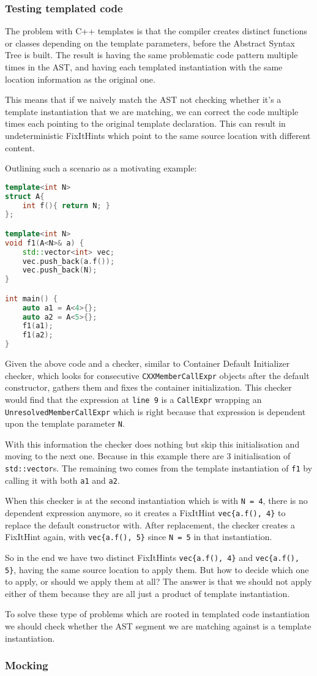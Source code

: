 \subsubsection{Testing templated code}
\par The problem with C++ templates is that the compiler creates distinct functions or classes depending on the template parameters, before the Abstract Syntax Tree is built. The result is having the same problematic code pattern multiple times in the AST, and having each templated instantiation with the same location information as the original one. \medskip
\par This means that if we naively match the AST not checking whether it's a template instantiation that we are matching, we can correct the code multiple times each pointing to the original template declaration. This can result in undeterministic FixItHints which point to the same source location with different content.  \pagebreak
\par Outlining such a scenario as a motivating example: 
\begin{lstlisting}[language=c++, frame=single]
template<int N>
struct A{
	int f(){ return N; }
};

template<int N>
void f1(A<N>& a) {
	std::vector<int> vec;
	vec.push_back(a.f());
	vec.push_back(N);
}

int main() {
	auto a1 = A<4>{};
	auto a2 = A<5>{};
	f1(a1);
	f1(a2);
}
\end{lstlisting}
Given the above code and a checker, similar to Container Default Initializer checker, which looks for consecutive \verb|CXXMemberCallExpr| objects after the default constructor, gathers them and fixes the container initialization. This checker would find that the expression at \verb|line 9| is a \verb|CallExpr| wrapping an \verb|UnresolvedMemberCallExpr| which is right because that expression is dependent upon the template parameter \verb|N|. \medskip
\par With this information the checker does nothing but skip this initialisation and moving to the next one. Because in this example there are 3 initialisation of \verb|std::vector|s. The remaining two comes from the template instantiation of \verb|f1| by calling it with both \verb|a1| and \verb|a2|. \medskip
\par When this checker is at the second instantiation which is with \verb|N = 4|, there is no dependent expression anymore, so it creates a FixItHint \verb|vec{a.f(), 4}| to replace the default constructor with. After replacement, the checker creates a FixItHint again, with \verb|vec{a.f(), 5}| since \verb|N = 5| in that instantiation. \medskip
\par So in the end we have two distinct FixItHints  \verb|vec{a.f(), 4}| and  \verb|vec{a.f(), 5}|, having the same source location to apply them. But how to decide which one to apply, or should we apply them at all? The answer is that we should not apply either of them because they are all just a product of template instantiation.  \medskip
\par To solve these type of problems which are rooted in templated code instantiation we should check whether the AST segment we are matching against is a template instantiation.

\subsubsection{Mocking}